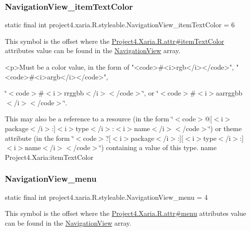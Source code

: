 \subsubsection{\texorpdfstring{Navigation\+View\+\_\+item\+Text\+Color}{NavigationView\_itemTextColor}}
{\footnotesize\ttfamily static final int project4.\+xaria.\+R.\+styleable.\+Navigation\+View\+\_\+item\+Text\+Color = 6\hspace{0.3cm}{\ttfamily [static]}}

This symbol is the offset where the \hyperlink{}{Project4.\+Xaria.\+R.\+attr\#item\+Text\+Color} attribute\textquotesingle{}s value can be found in the \hyperlink{classproject4_1_1xaria_1_1R_1_1styleable_a93b7138d1a19f728c4d3933a75ce23e2}{Navigation\+View} array.

\begin{DoxyVerb}      <p>Must be a color value, in the form of "<code>#<i>rgb</i></code>", "<code>#<i>argb</i></code>",
\end{DoxyVerb}
 \char`\"{}$<$code$>$\#$<$i$>$rrggbb$<$/i$>$$<$/code$>$\char`\"{}, or \char`\"{}$<$code$>$\#$<$i$>$aarrggbb$<$/i$>$$<$/code$>$\char`\"{}. 

This may also be a reference to a resource (in the form \char`\"{}$<$code$>$@\mbox{[}$<$i$>$package$<$/i$>$\+:\mbox{]}$<$i$>$type$<$/i$>$\+:$<$i$>$name$<$/i$>$$<$/code$>$\char`\"{}) or theme attribute (in the form \char`\"{}$<$code$>$?\mbox{[}$<$i$>$package$<$/i$>$\+:\mbox{]}\mbox{[}$<$i$>$type$<$/i$>$\+:\mbox{]}$<$i$>$name$<$/i$>$$<$/code$>$\char`\"{}) containing a value of this type.  name Project4.\+Xaria\+:item\+Text\+Color \mbox{\label{classproject4_1_1xaria_1_1R_1_1styleable_a022d160eabbea5a2a77ffa237987cbe8}} 
\subsubsection{\texorpdfstring{Navigation\+View\+\_\+menu}{NavigationView\_menu}}
{\footnotesize\ttfamily static final int project4.\+xaria.\+R.\+styleable.\+Navigation\+View\+\_\+menu = 4\hspace{0.3cm}{\ttfamily [static]}}

This symbol is the offset where the \hyperlink{}{Project4.\+Xaria.\+R.\+attr\#menu} attribute\textquotesingle{}s value can be found in the \hyperlink{classproject4_1_1xaria_1_1R_1_1styleable_a93b7138d1a19f728c4d3933a75ce23e2}{Navigation\+View} array.

